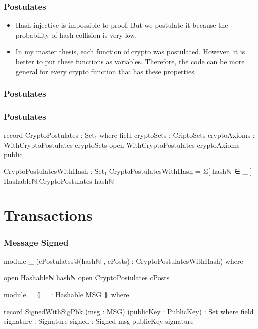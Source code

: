\documentclass{beamer}
\begin{document}
\begin{frame}
  \frametitle{Postulates}
  \begin{itemize}[<+->]
    \item Hash injective is impossible to proof.
      But we postulate it because the probability of hash collision is very low.
    \item In my master thesis, each function of crypto was postulated.
      However, it is better to put these functions as variables.
      Therefore, the code can be more general for every crypto function that has these properties.
  \end{itemize}
\end{frame}

\begin{frame}
  \frametitle{Postulates}
\end{frame}

\begin{frame}
  \frametitle{Postulates}
  \begin{code}
  record CryptoPostulates : Set₁ where
    field
      cryptoSets : CriptoSets
      cryptoAxioms : WithCryptoPostulates cryptoSets
    open WithCryptoPostulates cryptoAxioms public

CryptoPostulatesWithHash : Set₁
CryptoPostulatesWithHash = Σ[ hashℕ ∈ _ ]
  Hashableℕ.CryptoPostulates hashℕ
  \end{code}
\end{frame}

\section{Transactions}

\begin{frame}
  \frametitle{Message Signed}
\begin{code}
module _ (cPostulates@(hashℕ , cPosts)
           : CryptoPostulatesWithHash) where

  open Hashableℕ hashℕ
  open CryptoPostulates cPosts

  module _ ⦃ _ : Hashable MSG ⦄ where

    record SignedWithSigPbk  (msg : MSG)
      (publicKey : PublicKey) : Set where
      field
        signature : Signature
        signed    : Signed msg publicKey signature

\end{code}
\end{frame}
\end{document}
